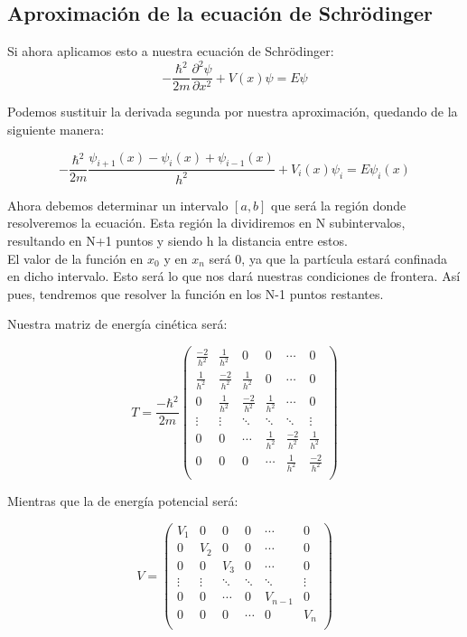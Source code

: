 \documentclass{article}
\begin{document}
	\subsection{Aproximación de la ecuación de Schrödinger}
Si ahora aplicamos esto a nuestra ecuación de Schrödinger:
\begin{equation*}
	-\frac{\hbar^2}{2m} \frac{\partial^2\psi}{\partial x^2} + V(x)\psi = E \psi
\end{equation*}

Podemos sustituir la derivada segunda por nuestra aproximación, quedando de la siguiente manera:

\begin{equation}
	-\frac{\hbar^2}{2m} \frac{\psi_{i+1}(x)-\psi_i(x)+\psi_{i-1}(x)}{h^2} + V_i(x)\psi_i = E \psi_i(x)
\end{equation}

Ahora debemos determinar un intervalo $[a,b]$ que será la región donde resolveremos 
la ecuación. Esta región la dividiremos en N subintervalos, resultando en N+1 puntos y siendo h la distancia entre estos.\\

El valor de la función en $x_0$ y en $x_n$ será 0, ya que la partícula estará confinada en dicho intervalo. Esto será lo que nos dará nuestras condiciones de frontera. Así pues, tendremos que resolver la función en los N-1 puntos restantes.

Nuestra matriz de energía cinética será:

\begin{equation}
	T=\frac{-\hbar^2}{2m} \left(
  \begin{matrix}
  \frac{-2}{h^2} & \frac{1}{h^2} & 0 & 0 &  \cdots & 0 \\
  \frac{1}{h^2} & \frac{-2}{h^2} & \frac{1}{h^2} & 0 & \cdots & 0\\
  0 & \frac{1}{h^2} & \frac{-2}{h^2} & \frac{1}{h^2} & \cdots & 0\\
  \vdots & \vdots&\ddots &\ddots &\ddots& \vdots \\
  0 & 0   &\cdots &\frac{1}{h^2}& \frac{-2}{h^2} & \frac{1}{h^2} \\
  0 & 0 & 0  &\cdots & \frac{1}{h^2} & \frac{-2}{h^2} \\
  \end{matrix}
	\right)
\end{equation}

Mientras que la de energía potencial será:

\begin{equation}
	V= \left(
	\begin{matrix}
		V_1 & 0 & 0 & 0 &  \cdots & 0 \\
		0 & V_2 & 0 & 0 & \cdots & 0\\
		0 & 0 & V_3 & 0 & \cdots & 0\\
		\vdots & \vdots&\ddots &\ddots &\ddots& \vdots \\
		0 & 0   &\cdots &0& V_{n-1} & 0 \\
		0 & 0 & 0  &\cdots & 0 & V_{n} \\
	\end{matrix}
	\right)
\end{equation}
\end{document}
